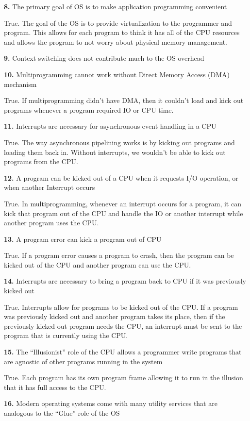 \documentclass[12pt]{article}
\begin{document}
{\bf 8.} The primary goal of OS is to make application programming convenient

True. The goal of the OS is to provide virtualization to the programmer and program. This allows for each program to think it has all of the CPU resources and allows the program to not worry about physical memory management. 

{\bf 9.} Context switching does not contribute much to the OS overhead

{\bf 10.} Multiprogramming cannot work without Direct Memory Access (DMA) mechanism

True. If multiprogramming didn't have DMA, then it couldn't load and kick out programs whenever a program required IO or CPU time. 

{\bf 11.} Interrupts are necessary for asynchronous event handling in a CPU

True. The way asynchronous pipelining works is by kicking out programs and loading them back in. Without interrupts, we wouldn't be able to kick out programs from the CPU. 

{\bf 12.} A program can be kicked out of a CPU when it requests I/O operation, or when another
Interrupt occurs

True. In multiprogramming, whenever an interrupt occurs for a program, it can kick that program out of the CPU and handle the IO or another interrupt while another program uses the CPU. 

{\bf 13.} A program error can kick a program out of CPU

True. If a program error causes a program to crash, then the program can be kicked out of the CPU and another program can use the CPU. 

{\bf 14.} Interrupts are necessary to bring a program back to CPU if it was previously kicked out

True. Interrupts allow for programs to be kicked out of the CPU. If a program was previously kicked out and another program takes its place, then if the previously kicked out program needs the CPU, an interrupt must be sent to the program that is currently using the CPU. 

{\bf 15.} The “Illusionist” role of the CPU allows a programmer write programs that are agnostic of
other programs running in the system

True. Each program has its own program frame allowing it to run in the illusion that it has full access to the CPU. 

{\bf 16.} Modern operating systems come with many utility services that are analogous to the “Glue”
role of the OS
\end{document}
